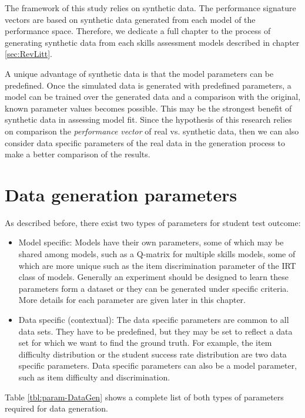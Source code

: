 \label{sec:Syn}

The framework of this study relies on synthetic data. The performance signature vectors are based on synthetic data generated from each model of the performance space. Therefore, we dedicate a full chapter to the process of generating synthetic data from each skills assessment models described in chapter \ref{sec:RevLitt}.

A unique advantage of synthetic data is that the model parameters can be predefined. Once the simulated data is generated with predefined parameters, a model can be trained over the generated data and a comparison with the original, known parameter values becomes possible. This may be the strongest benefit of synthetic data in assessing model fit. Since the hypothesis of this research relies on comparison the \textit{performance vector} of real vs. synthetic data, then we can also consider data specific parameters of the real data in the generation process to make a better comparison of the results.

\section{Data generation parameters}

As described before, there exist two types of parameters for student test outcome:
\begin{itemize}
\item Model specific: Models have their own parameters, some of which may be shared among models, such as a Q-matrix for multiple skills models, some of which are more unique such as the item discrimination parameter of the IRT class of models. Generally an experiment should be designed to learn these parameters form a dataset or they can be generated under specific criteria. More details for each parameter are given later in this chapter.
\item Data specific (contextual): The data specific parameters are common to all data sets. They have to be predefined, but they may be set to reflect a data set for which we want to find the ground truth. For example, the item difficulty distribution or the student success rate distribution are two data specific parameters. Data specific parameters can also be a model parameter, such as item difficulty and discrimination.
\end{itemize}

Table \ref{tbl:param-DataGen} shows a complete list of both types of parameters required for data generation.

